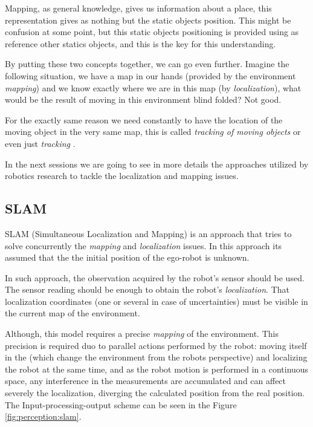 Mapping, as general knowledge, gives us information about a place, this representation gives as nothing but the static objects position. This might be confusion at some point, but this static objects positioning is provided using as reference other statics objects, and this is the key for this understanding.

By putting these two concepts together, we can go even further. Imagine the following situation, we have a map in our hands (provided by the environment \textit{mapping}) and we know exactly where we are in this map (by \textit{localization}), what would be the result of moving in this environment blind folded? Not good.

For the exactly same reason we need constantly to have the location of the moving object in the very same map, this is called \textit{tracking of moving objects} or even just \textit{tracking} \cite{Wang04a}.

In the next sessions we are going to see in more details the approaches utilized by robotics research to tackle the localization and mapping issues.

\subsection{SLAM}

SLAM (Simultaneous Localization and Mapping) is an approach that tries to solve concurrently the \textit{mapping} and \textit{localization} issues\cite{VU-2009-454238}. In this approach its assumed that the the initial position of the ego-robot is unknown. 

In such approach,  the observation acquired by the robot's sensor should be used. The sensor reading should be enough to obtain the robot's \textit{localization}. That localization coordinates (one or several in case of uncertainties) must be visible in the current map of the environment. 

Although, this model requires a precise \textit{mapping} of the environment. This precision is required duo to parallel actions performed by the robot: moving itself in the (which change the environment from the robots perspective) and localizing the robot at the same time, and as the robot motion is performed in a continuous space, any interference in the measurements are accumulated and can affect severely the localization, diverging the calculated position from the real position. The Input-processing-output scheme can be seen in the Figure \ref{fig:perception:slam}.

